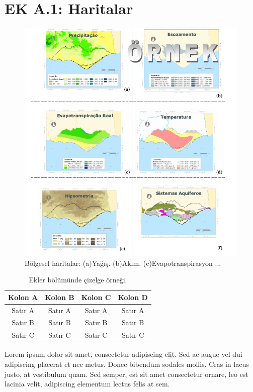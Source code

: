 \vspace*{20pt}


\chapter{EK A.1: Haritalar}

\begin{figure}[h!]
\centering{}\includegraphics[width=430pt]{fig/haritalar} \caption{\label{fig:6-1}Bölgesel haritalar: (a)Yağış. (b)Akım. (c)Evapotranspirasyon
...}
\end{figure}

\noindent 
\begin{table}
\caption{\label{tableappendix2}Ekler bölümünde çizelge örneği.}

\centering{}%
\begin{tabular}{cccc}
\hline 
Kolon A  & Kolon B  & Kolon C  & Kolon D \tabularnewline
\hline 
Satır A  & Satır A  & Satır A  & Satır A \tabularnewline
Satır B  & Satır B  & Satır B  & Satır B \tabularnewline
Satır C  & Satır C  & Satır C  & Satır C \tabularnewline
\hline 
\end{tabular}
\end{table}

Lorem ipsum dolor sit amet, consectetur adipiscing elit. Sed ac augue
vel dui adipiscing placerat et nec metus. Donec bibendum sodales mollis.
Cras in lacus justo, at vestibulum quam. Sed semper, est sit amet
consectetur ornare, leo est lacinia velit, adipiscing elementum lectus
felis at sem.

